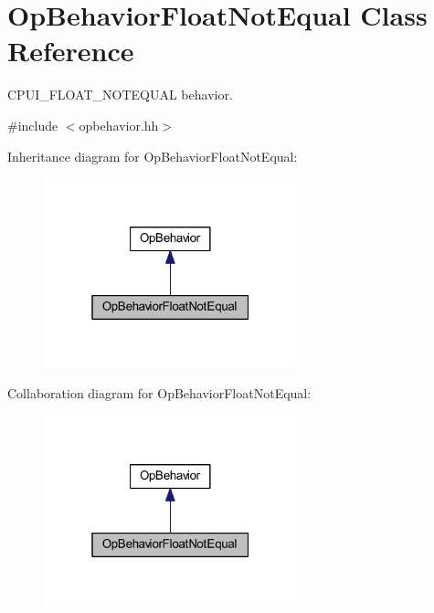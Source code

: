 \hypertarget{class_op_behavior_float_not_equal}{}\section{Op\+Behavior\+Float\+Not\+Equal Class Reference}
\label{class_op_behavior_float_not_equal}


C\+P\+U\+I\+\_\+\+F\+L\+O\+A\+T\+\_\+\+N\+O\+T\+E\+Q\+U\+AL behavior.  




{\ttfamily \#include $<$opbehavior.\+hh$>$}



Inheritance diagram for Op\+Behavior\+Float\+Not\+Equal\+:
\nopagebreak
\begin{figure}[H]
\begin{center}
\leavevmode
\includegraphics[width=208pt]{class_op_behavior_float_not_equal__inherit__graph}
\end{center}
\end{figure}


Collaboration diagram for Op\+Behavior\+Float\+Not\+Equal\+:
\nopagebreak
\begin{figure}[H]
\begin{center}
\leavevmode
\includegraphics[width=208pt]{class_op_behavior_float_not_equal__coll__graph}
\end{center}
\end{figure}
